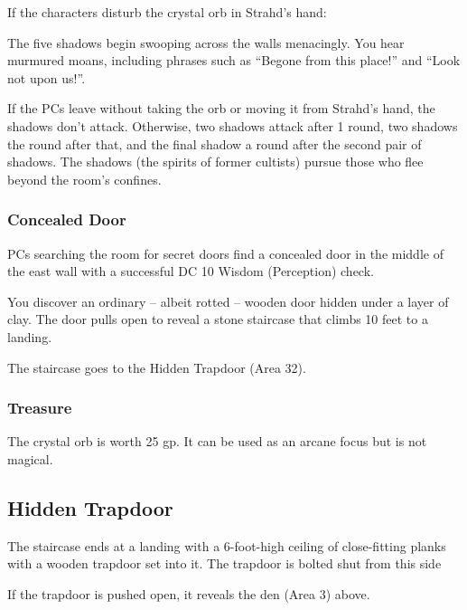If the characters disturb the crystal orb in Strahd's hand:
\begin{readout}
  The five shadows begin swooping across the walls menacingly. You hear murmured moans, including phrases
  such as ``Begone from this place!'' and ``Look not upon us!''.
\end{readout}
If the PCs leave without taking the orb or moving it from Strahd's hand, the shadows don't attack. Otherwise, 
two shadows attack after 1 round, two shadows the round after that, and the final shadow a round after the
second pair of shadows. The shadows (the spirits of former cultists) pursue those who flee beyond the room's
confines.

\subsubsection*{Concealed Door}
PCs searching the room for secret doors find a concealed door in the middle of the east wall with a successful
DC 10 Wisdom (Perception) check.
\begin{readout}
  You discover an ordinary -- albeit rotted -- wooden door hidden under a layer of clay. The door pulls open
  to reveal a stone staircase that climbs 10 feet to a landing.
\end{readout}
The staircase goes to the Hidden Trapdoor (Area 32).

\subsubsection*{Treasure}
The crystal orb is worth 25 gp. It can be used as an arcane focus but is not magical.

\begin{arealinks}
\end{arealinks}


\pagebreak
\subsection{Hidden Trapdoor}
\label{sec:HiddenTrapdoor}
\begin{readout}
  The staircase ends at a landing with a 6-foot-high ceiling of close-fitting planks with a wooden trapdoor
  set into it. The trapdoor is bolted shut from this side
\end{readout}
If the trapdoor is pushed open, it reveals the den (Area 3) above.

